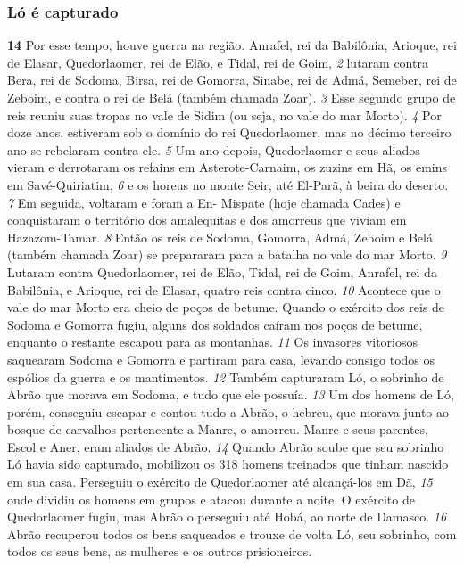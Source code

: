 \subsubsection*{Ló é capturado}
\textbf{\large 14}
 Por esse tempo, houve guerra na região. Anrafel, rei da Babilônia, Arioque, rei de Elasar, Quedorlaomer, rei de Elão, e Tidal, rei de Goim, 
\textit{\tiny 2}
lutaram contra Bera, rei de Sodoma, Birsa, rei de Gomorra, Sinabe, rei de Admá,
Semeber, rei de Zeboim, e contra o rei de Belá (também chamada Zoar).
\textit{\tiny 3}
Esse segundo grupo de reis reuniu suas tropas no vale de Sidim (ou seja, no
vale do mar Morto). 
\textit{\tiny 4}
Por doze anos, estiveram sob o domínio do rei
Quedorlaomer, mas no décimo terceiro ano se rebelaram contra ele.
\textit{\tiny 5}
Um   ano depois, Quedorlaomer e seus aliados vieram e derrotaram os refains
em Asterote-Carnaim, os zuzins em Hã, os emins em Savé-Quiriatim,
\textit{\tiny 6}
e os horeus
no monte Seir, até El-Parã, à beira do deserto. 
\textit{\tiny 7}
Em seguida, voltaram e foram a En-
Mispate (hoje chamada Cades) e conquistaram o território dos amalequitas e dos
amorreus que viviam em Hazazom-Tamar.
\textit{\tiny 8}
Então os reis de Sodoma, Gomorra, Admá, Zeboim e Belá (também chamada
Zoar) se prepararam para a batalha no vale do mar Morto.
\textit{\tiny 9}
Lutaram contra
Quedorlaomer, rei de Elão, Tidal, rei de Goim, Anrafel, rei da Babilônia, e Arioque,
rei de Elasar, quatro reis contra cinco. 
\textit{\tiny 10}
Acontece que o vale do mar Morto era
cheio de poços de betume. Quando o exército dos reis de Sodoma e Gomorra
fugiu, alguns dos soldados caíram nos poços de betume, enquanto o restante
escapou para as montanhas. 
\textit{\tiny 11}
Os invasores vitoriosos saquearam Sodoma e
Gomorra e partiram para casa, levando consigo todos os espólios da guerra e os
mantimentos. 
\textit{\tiny 12}
Também capturaram Ló, o sobrinho de Abrão que morava em
Sodoma, e tudo que ele possuía.
\textit{\tiny 13}
Um dos homens de Ló, porém, conseguiu escapar e contou tudo a Abrão, o
hebreu, que morava junto ao bosque de carvalhos pertencente a Manre, o
amorreu. Manre e seus parentes, Escol e Aner, eram aliados de Abrão.
\textit{\tiny 14}
Quando Abrão soube que seu sobrinho Ló havia sido capturado, mobilizou os 318
 homens treinados que tinham nascido em sua casa. Perseguiu o exército de
Quedorlaomer até alcançá-los em Dã, 
\textit{\tiny 15}
onde dividiu os homens em grupos e
atacou durante a noite. O exército de Quedorlaomer fugiu, mas Abrão o perseguiu
até Hobá, ao norte de Damasco. 
\textit{\tiny 16}
Abrão recuperou todos os bens saqueados e
trouxe de volta Ló, seu sobrinho, com todos os seus bens, as mulheres e os outros
prisioneiros.

